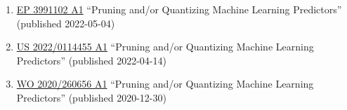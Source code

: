 \documentclass[10pt,a4paper]{article} %
\begin{document}
\newcommand{\patentref}[5]{\href{#4}{#1 #2} ``#3'' (granted #5)}
\newcommand{\patentpubref}[5]{\href{#4}{#1 #2} ``#3'' (published #5)}
{
    \begin{enumerate}
        \item [] \patentpubref{EP}
                                {3991102 A1}
                                {Pruning and/or Quantizing Machine Learning Predictors}
                                {https://patents.google.com/patent/EP3991102A1/en}
                                {2022-05-04}
        \item [] \patentpubref{US}
                                {2022/0114455 A1}
                                {Pruning and/or Quantizing Machine Learning Predictors}
                                {https://patentimages.storage.googleapis.com/36/80/74/01e3b22ef42a94/US20220114455A1.pdf}
                                {2022-04-14}
        \item [] \patentpubref{WO}
                                {2020/260656 A1}
                                {Pruning and/or Quantizing Machine Learning Predictors}
                                {https://patentimages.storage.googleapis.com/27/0b/d4/e3edd382b114fe/WO2020260656A1.pdf}
                                {2020-12-30}
    \end{enumerate}
}
\end{document}
